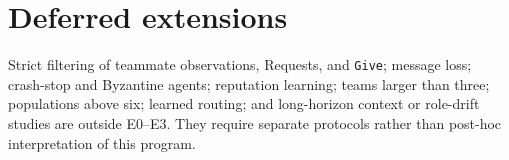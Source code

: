 \documentclass[11pt]{article}
\newcommand{\code}[1]{\texttt{#1}}
\begin{document}
\section{Deferred extensions}

Strict filtering of teammate observations, Requests, and \code{Give};
message loss; crash-stop and Byzantine agents; reputation learning; teams
larger than three; populations above six; learned routing; and long-horizon
context or role-drift studies are outside E0--E3.  They require separate
protocols rather than post-hoc interpretation of this program.
\end{document}
